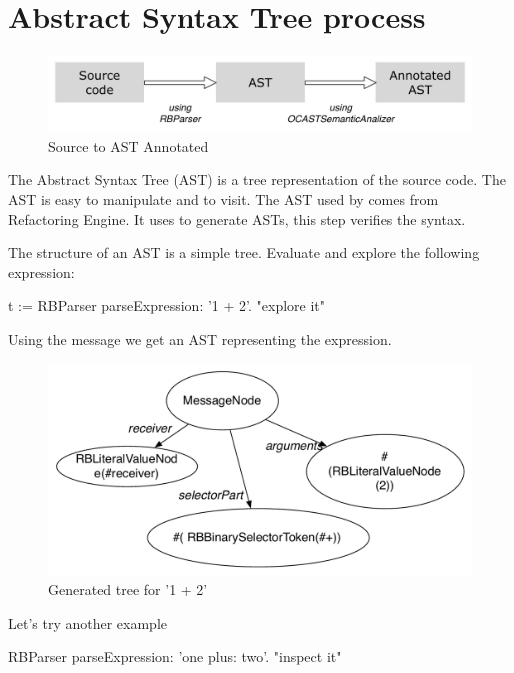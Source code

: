 \documentclass[a4paper,10pt,twoside]{book}
\begin{document}
\section{Abstract Syntax Tree process}

\begin{figure}[ht]\centering
	\includegraphics[width=\linewidth]{SourceToAnnotatedAST}
	\caption{Source to AST Annotated }
\end{figure}

The Abstract Syntax Tree (AST) is a tree representation of the source code. The AST is easy to manipulate and to visit. The AST used by \opal comes from Refactoring Engine. It uses  to generate ASTs, this step verifies the syntax.

The structure of an AST is a simple tree. Evaluate and explore the following expression:

\begin{code}{}
t := RBParser parseExpression: '1 + 2'.
"explore it"

\end{code}



Using the message  we get an AST representing the expression.

\begin{figure}[ht]
	\centering
	\includegraphics[width=0.7\linewidth]{SimpleAtomicExpression}
	\caption{Generated tree for  '1 + 2'  }
\end{figure}

Let's try another example
\begin{code}{}
RBParser parseExpression: 'one plus: two'.
"inspect it"
\end{code}
\end{document}
